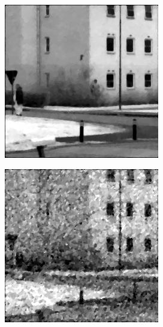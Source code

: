 \begin{figure}[H]
\begin{minipage}[t]{0.245\textwidth}
    \includegraphics[width = \textwidth]{result/dynamic/lum/intense_change.png}
    \label{fig:lum_2}
\end{minipage}
\begin{minipage}[t]{0.245\textwidth}
    \includegraphics[width = \textwidth]{result/dynamic/lum/intense_change_psnr_19_snr_14_sssim_38.png}

\end{minipage}
\end{figure}
